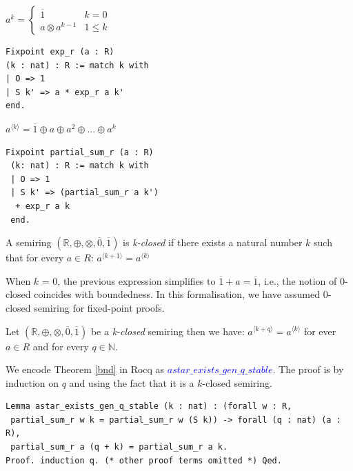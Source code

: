 \documentclass[a4paper,UKenglish,cleveref, autoref, thm-restate, anonymous]{lipics-v2021}
\begin{document}
\begin{minipage}{0.45\linewidth} 
  $a^{k} = 
  \begin{cases}
    \overline{1} & k = 0 \\
    a \otimes a^{k-1} & 1 \leq k  
  \end{cases}$

\begin{lstlisting}[language=Coq]
Fixpoint exp_r (a : R) 
(k : nat) : R := match k with 
| O => 1
| S k' => a * exp_r a k'
end.
\end{lstlisting}
\end{minipage}
  \hfill
\begin{minipage}{0.45\linewidth}{\vspace{3mm}}

$a^{\langle k \rangle} = \overline{1} \oplus a \oplus a^2 \oplus ... \oplus a^k$ 

\begin{lstlisting}[language=Coq]
Fixpoint partial_sum_r (a : R) 
 (k: nat) : R := match k with
 | O => 1
 | S k' => (partial_sum_r a k')  
  + exp_r a k
 end.
\end{lstlisting}
\end{minipage}
\vspace{2mm}




\begin{definition}
 A semiring \( (\mathbb{R}, \oplus, \otimes, \overline{0}, \overline{1}) \) is \textit{k-closed} \cite{10.5555/639508.639512} if there exists a natural number $k$ such that 
 for every $a \in R$: $a^{\langle k + 1 \rangle} = a^{\langle k \rangle}$

\end{definition}

When $k$ = 0, the previous expression simplifies to $\overline{1} + a = \overline{1}$, i.e., the notion of $0$-closed coincides with 
boundedness. In this formalisation, we have assumed  $0$-closed semiring for fixed-point proofs. 

\begin{theorem}\label{bnd}
    Let  \( (\mathbb{R}, \oplus, \otimes, \overline{0}, \overline{1}) \)  be a \textit{k-closed} semiring then we have:  $a^{\langle k + q \rangle} = a^{\langle k \rangle}$ for ever $a \in R$ and for every $q \in \mathbb{N}$. 
    
\end{theorem}
We encode Theorem \ref{bnd} in Rocq as \textcolor{blue}{$astar\_exists\_gen\_q\_stable$}. The proof is by induction on $q$ 
and using the fact that it is a $k$-closed semiring. 
\begin{lstlisting}[language=Coq]
Lemma astar_exists_gen_q_stable (k : nat) : (forall w : R, 
 partial_sum_r w k = partial_sum_r w (S k)) -> forall (q : nat) (a : R), 
 partial_sum_r a (q + k) = partial_sum_r a k.
Proof. induction q. (* other proof terms omitted *) Qed.
\end{lstlisting}
\end{document}
